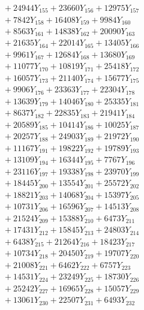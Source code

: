 \documentclass[a4paper,10pt]{article}
\begin{document}
{\begin{align}
&\;  + 24944 Y_{155} + 23660 Y_{156} + 12975 Y_{157} \\[0.3ex]
&\;  + 7842 Y_{158} + 16408 Y_{159} + 9984 Y_{160} \\[0.3ex]
&\;  + 8563 Y_{161} + 14838 Y_{162} + 20090 Y_{163} \\[0.3ex]
&\;  + 21635 Y_{164} + 22014 Y_{165} + 13405 Y_{166} \\[0.3ex]
&\;  + 9961 Y_{167} + 12684 Y_{168} + 13680 Y_{169} \\[0.3ex]
&\;  + 11077 Y_{170} + 10819 Y_{171} + 25418 Y_{172} \\[0.3ex]
&\;  + 16057 Y_{173} + 21140 Y_{174} + 15677 Y_{175} \\[0.3ex]
&\;  + 9906 Y_{176} + 23363 Y_{177} + 22304 Y_{178} \\[0.5ex]\allowbreak
&\;  + 13639 Y_{179} + 14046 Y_{180} + 25335 Y_{181} \\[0.3ex]
&\;  + 8637 Y_{182} + 22835 Y_{183} + 21941 Y_{184} \\[0.3ex]
&\;  + 20589 Y_{185} + 10414 Y_{186} + 10025 Y_{187} \\[0.3ex]
&\;  + 20257 Y_{188} + 24903 Y_{189} + 21972 Y_{190} \\[0.3ex]
&\;  + 11167 Y_{191} + 19822 Y_{192} + 19789 Y_{193} \\[0.3ex]
&\;  + 13109 Y_{194} + 16344 Y_{195} + 7767 Y_{196} \\[0.3ex]
&\;  + 23116 Y_{197} + 19338 Y_{198} + 23970 Y_{199} \\[0.3ex]
&\;  + 18445 Y_{200} + 13554 Y_{201} + 25572 Y_{202} \\[0.3ex]
&\;  + 18821 Y_{203} + 14068 Y_{204} + 15397 Y_{205} \\[0.3ex]
&\;  + 10731 Y_{206} + 16596 Y_{207} + 14513 Y_{208} \\[0.5ex]\allowbreak
&\;  + 21524 Y_{209} + 15388 Y_{210} + 6473 Y_{211} \\[0.3ex]
&\;  + 17431 Y_{212} + 15845 Y_{213} + 24803 Y_{214} \\[0.3ex]
&\;  + 6438 Y_{215} + 21264 Y_{216} + 18423 Y_{217} \\[0.3ex]
&\;  + 10734 Y_{218} + 20450 Y_{219} + 19707 Y_{220} \\[0.3ex]
&\;  + 21008 Y_{221} + 6462 Y_{222} + 6757 Y_{223} \\[0.3ex]
&\;  + 14531 Y_{224} + 23249 Y_{225} + 18730 Y_{226} \\[0.3ex]
&\;  + 25242 Y_{227} + 16965 Y_{228} + 15057 Y_{229} \\[0.3ex]
&\;  + 13061 Y_{230} + 22507 Y_{231} + 6493 Y_{232} \\[0.3ex]

\end{align}}
\end{document}

